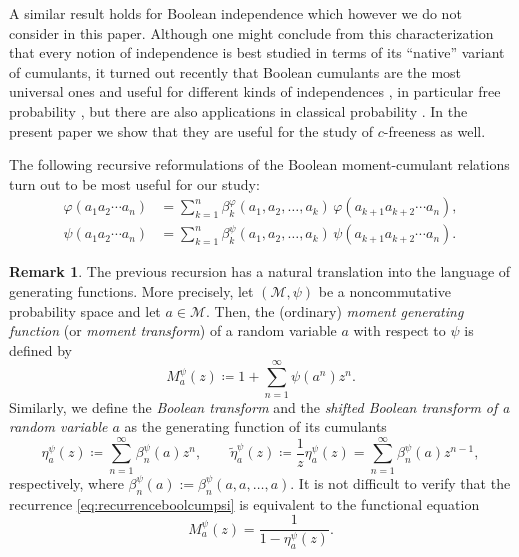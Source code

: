 \documentclass[12pt]{amsart}
\newcommand{\alg}[1]{\mathcal{#1}}
\theoremstyle{definition}
\newtheorem{remark}[theorem]{Remark}
\numberwithin{equation}{section}
\begin{document}
A similar result holds for Boolean independence which however we do not
consider in this paper. Although one might conclude from this characterization
that every notion of independence is best studied in terms of its ``native''
variant of cumulants,  it turned out recently that Boolean cumulants are the
most universal ones and useful for different kinds of independences
\cite{JekelLiu:2019:operad}, 
in particular
free probability \cite{FMNS2,LehnerSzpojan,LehnerSzpojankowski:2023:freeint1},
but there are also applications in classical probability
\cite{SaulisStatulevicius:1991:limit,VanWerdeSanders:2026:matrix}.
In the present paper we show that they are  useful for
the study of $c$-freeness as well.

The following recursive reformulations of the Boolean moment-cumulant relations
turn out to be most useful for our study:
\begin{align}
  \label{eq:recurrenceboolcum}
  \varphi(a_1a_2\dotsm a_n)
  &= \sum_{k=1}^n
    \beta_k^\varphi(a_1,a_2,\dots,a_k)\,\varphi(a_{k+1}a_{k+2}\dotsm a_n),
    \\
  \label{eq:recurrenceboolcumpsi}
  \psi(a_1a_2\dotsm a_n)
  &= \sum_{k=1}^n
    \beta_k^\psi(a_1,a_2,\dots,a_k)\,\psi(a_{k+1}a_{k+2}\dotsm a_n).
\end{align}

\begin{remark}
The previous recursion has a natural translation into the language of
generating functions. More precisely, let $(\alg{M},\psi)$ be a noncommutative
probability space and let $a\in \alg{M}$. Then, the (ordinary) \emph{moment
  generating function} (or \emph{moment transform}) of a random variable $a$ with respect to $\psi$ is defined by
\[M_a^\psi(z) \coloneqq 1 + \sum_{n=1}^\infty \psi(a^n)z^n.\]
Similarly, we define the \emph{Boolean transform} and the \emph{shifted Boolean
  transform of a random variable $a$} as the generating function of its cumulants
\[
\eta_a^\psi(z) \coloneqq  \sum_{n=1}^\infty \beta_n^\psi(a)z^n,\qquad \tilde\eta^\psi_a(z) \coloneqq  \frac{1}{z}\eta_a^\psi(z) = \sum_{n=1}^\infty \beta_n^\psi(a)z^{n-1},
\]
respectively, where $\beta_n^\psi(a) := \beta_n^\psi(a,a,\ldots,a).$
It is not difficult to verify that the recurrence
\eqref{eq:recurrenceboolcumpsi} is equivalent to the functional equation
\[
M_a^\psi(z) = \frac{1}{1-\eta_a^\psi(z)}.
\]
\end{remark}
\end{document}

